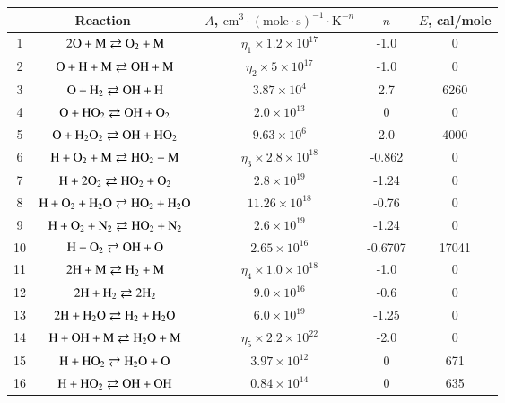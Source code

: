 \documentclass{warpdoc}
\renewcommand{\fontsizetable}{\footnotesize\scalefont{0.9}}
\begin{document}
%
\begin{table}[t]
\fontsizetable
\begin{center}
\begin{threeparttable}
\begin{tabular}{ccccc} 
\toprule
\multicolumn{2}{c}{Reaction} & $A$, $\textrm{cm}^3\cdot(\textrm{mole}\cdot \textrm{s})^{-1}\cdot \textrm{K}^{-n}$ & $n$ & $E$, cal/mole  \\ 
\midrule
    1 & $\rm 2O + M \rightleftarrows  O_2 + M$&$ \eta_1 \times 1.2 \times 10^{17}$& -1.0 &  0\\
    2 & $\rm O +  H + M \rightleftarrows  OH + M$  & $ \eta_2 \times 5 \times 10^{17} $& -1.0 &  0\\
    3& $\rm O +  H_2  \rightleftarrows  OH + H$  & $ 3.87 \times 10^{4} $& 2.7 & 6260 \\
    4 & $\rm O +  HO_2  \rightleftarrows  OH + O_2$  & $ 2.0 \times 10^{13} $& 0 & 0 \\
    5 & $\rm O +  H_2O_2  \rightleftarrows  OH + HO_2$  & $ 9.63 \times 10^{6} $& 2.0 & 4000  \\
    6 & $\rm H + O_2 + M  \rightleftarrows  HO_2 + M$  & $ \eta_3 \times 2.8 \times 10^{18} $& -0.862 & 0 \\
    7 & $\rm H + 2O_2  \rightleftarrows  HO_2 + O_2$  & $ 2.8 \times 10^{19} $& -1.24 & 0 \\
    8 & $\rm H + O_2 + H_2O  \rightleftarrows  HO_2 + H_2O$  & $ 11.26 \times 10^{18} $& -0.76 & 0 \\
    9 & $\rm H + O_2 + N_2  \rightleftarrows  HO_2 + N_2$  & $ 2.6 \times 10^{19} $& -1.24 & 0 \\
    10 & $\rm H + O_2 \rightleftarrows  OH + O$  & $ 2.65 \times 10^{16} $& -0.6707 & 17041 \\
    11 & $\rm 2H + M \rightleftarrows  H_2 + M$  & $ \eta_4 \times 1.0 \times 10^{18} $& -1.0 & 0 \\
    12 & $\rm 2H + H_2 \rightleftarrows  2H_2 $  & $ 9.0 \times 10^{16} $& -0.6 & 0 \\
    13 & $\rm 2H + H_2O \rightleftarrows  H_2 + H_2O$  & $ 6.0 \times 10^{19} $& -1.25 & 0 \\
    14 & $\rm H + OH + M \rightleftarrows  H_2O + M$  & $ \eta_5 \times 2.2 \times 10^{22} $& -2.0 & 0 \\
    15 & $\rm H + HO_2 \rightleftarrows  H_2O + O$  & $ 3.97 \times 10^{12} $& 0 & 671 \\
    16 & $\rm H + HO_2 \rightleftarrows  OH + OH$  & $ 0.84 \times 10^{14} $& 0 & 635 \\

\end{tabular}
\end{threeparttable}
\end{center}
\end{table}
\end{document}
